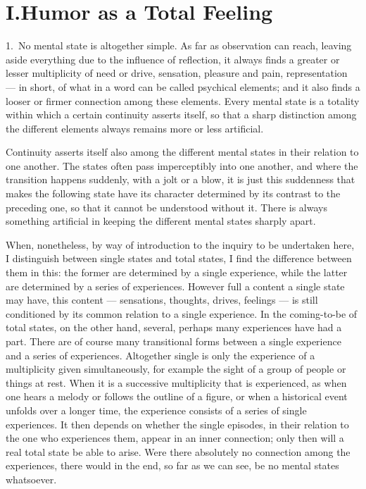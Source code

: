 \documentclass[12pt]{book}
\newcommand{\opage}[1]{\marginnote{\footnotesize\textit{[#1]}}}
\begin{document}
\chapter*{I.\quad Humor as a Total Feeling}
\opage{7}1.~No mental state is altogether simple. As far as observation
can reach, leaving aside everything due to the influence of reflection, it
always finds a greater or lesser multiplicity of need or drive, sensation,
pleasure and pain, representation --- in short, of what in a word can be
called psychical elements; and it also finds a looser or firmer connection
among these elements. Every mental state is a totality within which a certain
continuity asserts itself, so that a sharp distinction among the different
elements always remains more or less artificial.

Continuity asserts itself also among the different mental states in their
relation to one another. The states often pass imperceptibly into one another,
and where the transition happens suddenly, with a jolt or a blow, it is just
this suddenness that makes the following state have its character determined
by its contrast to the preceding one, so that it cannot be understood without
it. There is always something artificial in keeping the different mental states
sharply apart.

When, nonetheless, by way of introduction to the inquiry to be undertaken
here, I distinguish between single states and total states, I find the
difference between them in this: the former are determined by a single
experience, while the latter are determined by a series of experiences. However
full a content a single state may have, this content --- sensations, thoughts,
drives, feelings --- is still conditioned by its common relation to a single
experience. In the coming-to-be of total states, on the other hand, several,
perhaps many experiences have had a part. There are of course many
\opage{8}transitional forms between a single experience and a series of
experiences. Altogether single is only the experience of a multiplicity given
simultaneously, for example the sight of a group of people or things at rest.
When it is a successive multiplicity that is experienced, as when one hears a
melody or follows the outline of a figure, or when a historical event unfolds
over a longer time, the experience consists of a series of single experiences.
It then depends on whether the single episodes, in their relation to the one
who experiences them, appear in an inner connection; only then will a real
total state be able to arise. Were there absolutely no connection among the
experiences, there would in the end, so far as we can see, be no mental states
whatsoever.
\end{document}
